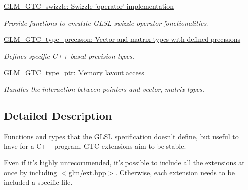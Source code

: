 \begin{DoxyCompactItemize}
\hyperlink{group__gtc__swizzle}{\-G\-L\-M\-\_\-\-G\-T\-C\-\_\-swizzle\-: Swizzle 'operator' implementation}
\begin{DoxyCompactList}\small\item\em \-Provide functions to emulate \-G\-L\-S\-L swizzle operator fonctionalities. \end{DoxyCompactList}\item 
\hyperlink{group__gtc__type__precision}{\-G\-L\-M\-\_\-\-G\-T\-C\-\_\-type\-\_\-precision\-: Vector and matrix types with defined precisions}
\begin{DoxyCompactList}\small\item\em \-Defines specific \-C++-\/based precision types. \end{DoxyCompactList}\item 
\hyperlink{group__gtc__type__ptr}{\-G\-L\-M\-\_\-\-G\-T\-C\-\_\-type\-\_\-ptr\-: Memory layout access}
\begin{DoxyCompactList}\small\item\em \-Handles the interaction between pointers and vector, matrix types. \end{DoxyCompactList}\end{DoxyCompactItemize}


\subsection{\-Detailed \-Description}
\-Functions and types that the \-G\-L\-S\-L specification doesn't define, but useful to have for a \-C++ program. \-G\-T\-C extensions aim to be stable.

\-Even if it's highly unrecommended, it's possible to include all the extensions at once by including $<$\hyperlink{ext_8hpp_source}{glm/ext.\-hpp}$>$. \-Otherwise, each extension needs to be included a specific file. 